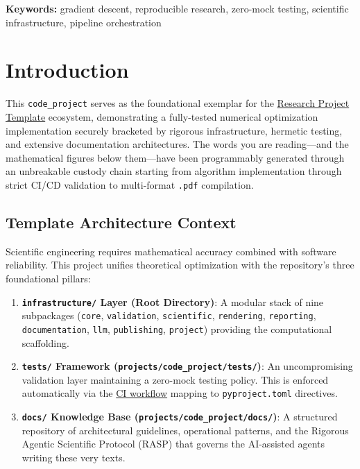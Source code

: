 \documentclass[
]{article}
\providecommand{\tightlist}{%
  \setlength{\itemsep}{0pt}\setlength{\parskip}{0pt}}
\begin{document}
\textbf{Keywords:} gradient descent, reproducible research, zero-mock
testing, scientific infrastructure, pipeline orchestration

\newpage

\section{Introduction}\label{introduction}

This \texttt{code\_project} serves as the foundational exemplar for the
\href{https://github.com/docxology/template}{Research Project Template}
ecosystem, demonstrating a fully-tested numerical optimization
implementation securely bracketed by rigorous infrastructure, hermetic
testing, and extensive documentation architectures. The words you are
reading---and the mathematical figures below them---have been
programmably generated through an unbreakable custody chain starting
from algorithm implementation through strict CI/CD validation to
multi-format \texttt{.pdf} compilation.

\subsection{Template Architecture
Context}\label{template-architecture-context}

Scientific engineering requires mathematical accuracy combined with
software reliability. This project unifies theoretical optimization with
the repository's three foundational pillars:

\begin{enumerate}
\def\labelenumi{\arabic{enumi}.}
\tightlist
\item
  \textbf{\texttt{infrastructure/} Layer (Root Directory)}: A modular
  stack of nine subpackages (\texttt{core}, \texttt{validation},
  \texttt{scientific}, \texttt{rendering}, \texttt{reporting},
  \texttt{documentation}, \texttt{llm}, \texttt{publishing},
  \texttt{project}) providing the computational scaffolding.
\item
  \textbf{\texttt{tests/} Framework
  (\texttt{projects/code\_project/tests/})}: An uncompromising
  validation layer maintaining a zero-mock testing policy. This is
  enforced automatically via the
  \href{https://github.com/docxology/template/blob/main/.github/workflows/ci.yml}{CI
  workflow} mapping to \texttt{pyproject.toml} directives.
\item
  \textbf{\texttt{docs/} Knowledge Base
  (\texttt{projects/code\_project/docs/})}: A structured repository of
  architectural guidelines, operational patterns, and the Rigorous
  Agentic Scientific Protocol (RASP) that governs the AI-assisted agents
  writing these very texts.
\end{enumerate}
\end{document}
